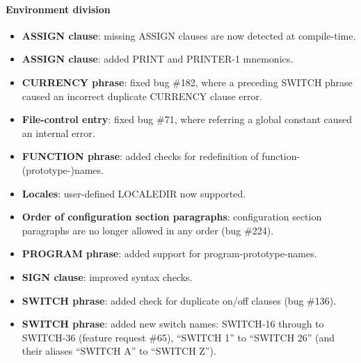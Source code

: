 \paragraph{Environment division}
\begin{itemize}
\item \textbf{ASSIGN clause}: missing ASSIGN clauses are now detected at compile-time.
\item \textbf{ASSIGN clause}: added PRINT and PRINTER-1 mnemonics.
\item \textbf{CURRENCY phrase}: fixed bug \#182, where a preceding SWITCH phrase caused an incorrect duplicate CURRENCY clause error.
\item \textbf{File-control entry}: fixed bug \#71, where referring a global constant caused an internal error.
\item \textbf{FUNCTION phrase}: added checks for redefinition of function-(prototype-)names.
\item \textbf{Locales}: user-defined LOCALEDIR now supported.
\item \textbf{Order of configuration section paragraphs}: configuration section paragraphs are no longer allowed in any order (bug \#224).
\item \textbf{PROGRAM phrase}: added support for program-prototype-names.
\item \textbf{SIGN clause}: improved syntax checks.
\item \textbf{SWITCH phrase}: added check for duplicate on\slash{}off clauses (bug \#136).
\item \textbf{SWITCH phrase}: added new switch names: SWITCH-16 through to SWITCH-36 (feature request \#65), ``SWITCH 1'' to ``SWITCH 26'' (and their aliases  ``SWITCH A'' to ``SWITCH Z'').
\end{itemize}

